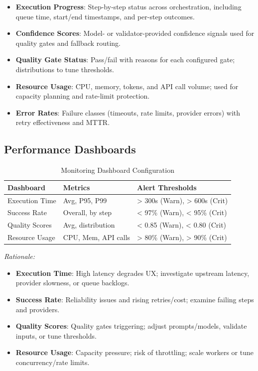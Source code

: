 \documentclass[11pt,a4paper]{article}
\begin{document}
\begin{itemize}
    \item \textbf{Execution Progress}: Step-by-step status across orchestration, including queue time, start/end timestamps, and per-step outcomes.
    \item \textbf{Confidence Scores}: Model- or validator-provided confidence signals used for quality gates and fallback routing.
    \item \textbf{Quality Gate Status}: Pass/fail with reasons for each configured gate; distributions to tune thresholds.
    \item \textbf{Resource Usage}: CPU, memory, tokens, and API call volume; used for capacity planning and rate-limit protection.
    \item \textbf{Error Rates}: Failure classes (timeouts, rate limits, provider errors) with retry effectiveness and MTTR.
\end{itemize}

\subsection{Performance Dashboards}

\begin{table}[H]
\centering
\renewcommand{\arraystretch}{1.25}
\setlength{\tabcolsep}{6pt}
\begin{tabularx}{\textwidth}{|l|l|X|}
\hline
\textbf{Dashboard} & \textbf{Metrics} & \textbf{Alert Thresholds} \\
\hline
Execution Time & Avg, P95, P99 & > 300s (Warn), > 600s (Crit) \\
Success Rate & Overall, by step & < 97\% (Warn), < 95\% (Crit) \\
Quality Scores & Avg, distribution & < 0.85 (Warn), < 0.80 (Crit) \\
Resource Usage & CPU, Mem, API calls & > 80\% (Warn), > 90\% (Crit) \\
\hline
\end{tabularx}
\caption{Monitoring Dashboard Configuration}
\end{table}

\small
\noindent\textit{Rationale:}
\begin{itemize}[leftmargin=*]
  \item \textbf{Execution Time}: High latency degrades UX; investigate upstream latency, provider slowness, or queue backlogs.
  \item \textbf{Success Rate}: Reliability issues and rising retries/cost; examine failing steps and providers.
  \item \textbf{Quality Scores}: Quality gates triggering; adjust prompts/models, validate inputs, or tune thresholds.
  \item \textbf{Resource Usage}: Capacity pressure; risk of throttling; scale workers or tune concurrency/rate limits.
\end{itemize}
\normalsize
\end{document}
